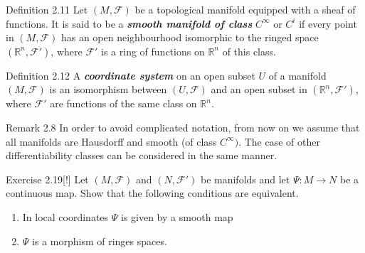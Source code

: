 \begin{thing3}{Definition 2.11}\label{def:2.11}\leavevmode
	Let $(M,\mathcal{F})$ be a topological manifold equipped with a sheaf of functions. It is said to be a \textit{\textbf{smooth manifold of class}} $C^\infty$ or  $C^i$ if every point in $(M,\mathcal{F})$ has an open neighbourhood isomorphic to the ringed space $(\mathbb{R}^n, \mathcal{F}')$, where $\mathcal{F}'$ is a ring of functions on $\mathbb{R}^n$ of this class.
\end{thing3}

\begin{thing3}{Definition 2.12}\leavevmode
A \textit{\textbf{coordinate system}} on an open subset $U$ of a manifold $(M,\mathcal{F})$ is an isomorphism between $(U,\mathcal{F})$ and an open subset in $(\mathbb{R}^n,\mathcal{F}')$, where $\mathcal{F}'$ are functions of the same class on $\mathbb{R}^n$.
\end{thing3}

\begin{thing5}{Remark 2.8}\leavevmode
In order to avoid complicated notation, from now on we assume that all manifolds are Hausdorff and smooth (of class $C^\infty)$. The case of other differentiability classes can be considered in the same manner.
\end{thing5}

\begin{thing4}{Exercise 2.19}[!]\label{exer:2.19}\leavevmode
Let $(M,\mathcal{F})$ and $(N,\mathcal{F}')$ be manifolds and let $\Psi:M \to N$ be a continuous map. Show that the following conditions are equivalent.
\begin{enumerate}[label=(\roman*)]
\item In local coordinates $\Psi$ is given by a smooth map
\item $\Psi$ is a morphism of ringes spaces.
\end{enumerate}
\end{thing4}


